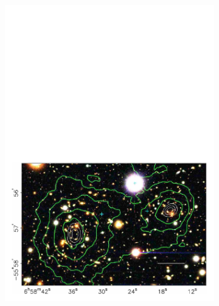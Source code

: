 \begin{figure}[!ht]
     \centering
     \begin{subfigure}{0.49\textwidth}
         \centering
         \includegraphics[width=\textwidth]{figures/DMOverview/f1a.new.jpeg2ps.pdf}
         \caption{}
         \label{fig:DMOverview/BCGravLensMap}
     \end{subfigure}
     \hfill
     \begin{subfigure}{0.49\textwidth}
         \centering

\end{subfigure}
\end{figure}
